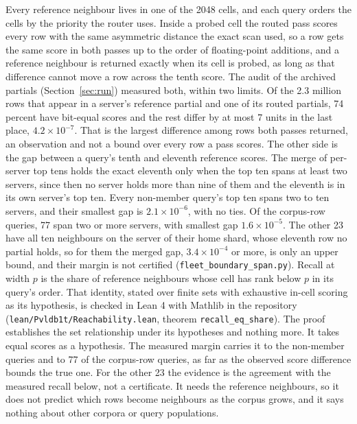 \documentclass[sigconf, nonacm]{acmart}
\begin{document}
Every reference neighbour lives in one of the 2048 cells, and each query orders the cells by the
priority the router uses. Inside a probed cell the routed pass scores every row with the same
asymmetric distance the exact scan used, so a row gets the same score in both passes up to the
order of floating-point additions, and a reference neighbour is returned exactly when its cell is
probed, as long as that difference cannot move a row across the tenth score. The audit of the
archived partials (Section~\ref{sec:run}) measured both, within two limits. Of the 2.3 million rows
that appear in a server's reference partial and one of its routed partials, 74 percent have
bit-equal scores and the rest differ by at most 7 units in the last place, $4.2\times10^{-7}$. That
is the largest difference among rows both passes returned, an observation and not a bound over
every row a pass scores. The other side is the gap between a query's tenth and eleventh reference
scores. The merge of per-server top tens holds the exact eleventh only when the top ten spans at
least two servers, since then no server holds more than nine of them and the eleventh is in its own
server's top ten. Every non-member query's top ten spans two to ten servers, and their smallest gap
is $2.1\times10^{-6}$, with no ties. Of the corpus-row queries, 77 span two or more servers, with
smallest gap $1.6\times10^{-5}$. The other 23 have all ten neighbours on the server of their home
shard, whose eleventh row no partial holds, so for them the merged gap, $3.4\times10^{-4}$ or more,
is only an upper bound, and their margin is not certified (\texttt{fleet\_boundary\_span.py}).
Recall at width $p$ is the share of
reference neighbours whose cell has rank below $p$ in its query's order. That identity, stated over
finite sets with exhaustive in-cell scoring as its hypothesis, is checked in Lean 4 with Mathlib in
the repository (\texttt{lean/Pvldb1t/Reachability.lean}, theorem \texttt{recall\_eq\_share}). The
proof establishes the set relationship under its hypotheses and nothing more. It takes equal
scores as a hypothesis. The measured margin carries it to the non-member queries and to 77 of the
corpus-row queries, as far as the observed score difference bounds the true one. For the other 23
the evidence is the agreement with the measured recall below, not a certificate. It needs the
reference neighbours, so it does not predict which rows become neighbours as the corpus grows, and
it says nothing about other corpora or query populations.
\end{document}
